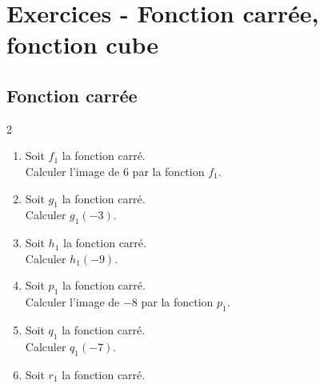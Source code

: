 \section*{Exercices - Fonction carrée, fonction cube}
{\setlength{\columnseprule}{0pt}
\setcounter{NumEx}{1}

\subsection*{Fonction carrée}


\begin{Exercice}%
\leavevmode\vspace{-\baselineskip}
\begin{multicols}{2}
\begin{enumerate}[itemsep=1em]
	\item \begin{minipage}[t]{\linewidth}Soit $f_1$ la fonction carré.\\
      
      Calculer l'image de $6$ par la fonction $f_1$.\end{minipage}
	\item \begin{minipage}[t]{\linewidth}Soit $g_1$ la fonction carré.\\
      
      Calculer $g_1(-3)$.\end{minipage}
	\item \begin{minipage}[t]{\linewidth}Soit $h_1$ la fonction carré.\\
      
      Calculer $h_1(-9)$.\end{minipage}
	\item \begin{minipage}[t]{\linewidth}Soit $p_1$ la fonction carré.\\
      
      Calculer l'image de $-8$ par la fonction $p_1$.\end{minipage}
	\item \begin{minipage}[t]{\linewidth}Soit $q_1$ la fonction carré.\\
      
      Calculer $q_1(-7)$.\end{minipage}
	\item \begin{minipage}[t]{\linewidth}Soit $r_1$ la fonction carré.\\
      

\end{minipage}
\end{enumerate}
\end{multicols}
\end{Exercice}}
